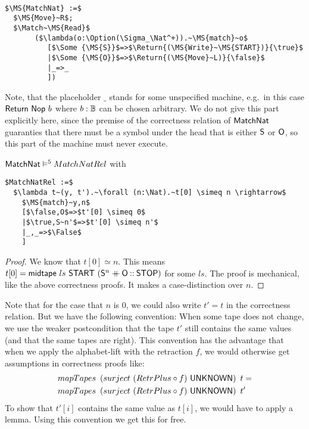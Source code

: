 \begin{definition}[$\MS{MatchNat}$][MatchNat]
  \label{def:MatchNat}
  ~
\begin{lstlisting}[style=semicoqstyle]
$\MS{MatchNat} :=$
  $\MS{Move}~R$; 
  $\Match~\MS{Read}$ 
       ($\lambda(o:\Option(\Sigma_\Nat^+)).~\MS{match}~o$
          [$\Some {\MS{S}}$=>$\Return{(\MS{Write}~\MS{START})}{\true}$
          |$\Some {\MS{O}}$=>$\Return{(\MS{Move}~L)}{\false}$
          |_=>_ 
          ])
\end{lstlisting}
\end{definition}

Note, that the placeholder $\_$ stands for some unspecified machine, e.g.\ in this case $\mathsf{Return}~\mathsf{Nop}~b$ where $b:\mathbb{B}$ can be chosen arbitrary.
We do not give this part explicitly here, since the premise of the correctness relation of $\MS{MatchNat}$ guaranties that there must be a symbol
under the head that is either $\mathsf{S}$ or $\mathsf{O}$, so this part of the machine must never execute.

\begin{lemma}
  $\mathsf{MatchNat} \mathrel{\vDash^{5}} MatchNatRel$ with
\begin{lstlisting}[style=semicoqstyle]
$MatchNatRel :=$
  $\lambda t~(y, t').~\forall (n:\Nat).~t[0] \simeq n \rightarrow$
    $\MS{match}~y,n$
    [$\false,O$=>$t'[0] \simeq 0$
    |$\true,S~n'$=>$t'[0] \simeq n'$
    |_,_=>$\False$
    ]
\end{lstlisting}
\end{lemma}
\begin{proof}
  We know that $t[0] \simeq n$.  This means $t[0] = \mathsf{midtape}~ls~\mathsf{START}~(\mathsf{S}^n \mathbin{+\mkern-10mu+} \mathsf{O} \mathbin{::} \mathsf{STOP})$ for some $ls$.  The proof is
  mechanical, like the above correctness proofs.  It makes a case-distinction over $n$.
\end{proof}

Note that for the case that $n$ is $0$, we could also write $t'=t$ in the correctness relation.  But we have the following convention: When some tape
does not change, we use the weaker postcondition that the tape $t'$ still contains the same values (and that the same tapes are right).  This
convention has the advantage that when we apply the alphabet-lift with the retraction $f$, we would otherwise get assumptions in correctness proofs
like:
\begin{align*}
  & mapTapes~\left(surject~(RetrPlus \circ f)~\mathsf{UNKNOWN}\right)~t = \\
  & mapTapes~\left(surject~(RetrPlus \circ f)~\mathsf{UNKNOWN}\right)~t'
\end{align*}
To show that $t'[i]$ contains the same value as $t[i]$, we would have to apply a lemma.  Using this convention we get this for free.


